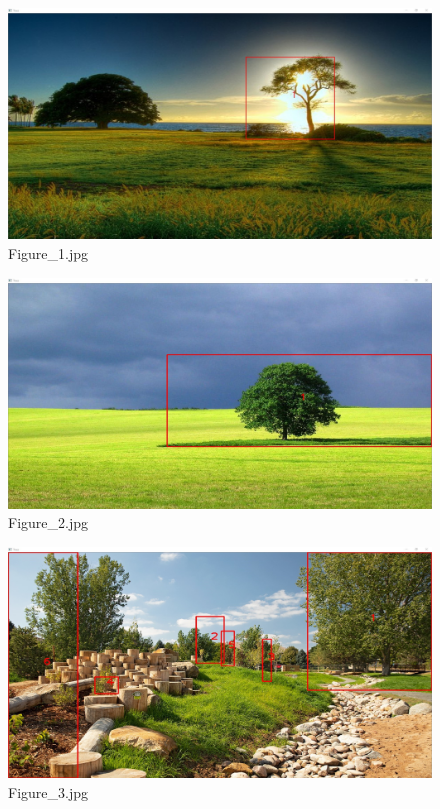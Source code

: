 \documentclass{article}
\begin{document}
\begin{figure}[h]
\begin{center}
\includegraphics[width=1\textwidth]{images/b1}
\caption{\footnotesize{Figure\_1.jpg}}
\label{img:benchmark1}
\end{center}
\end{figure}

\begin{figure}[h]
\begin{center}
\includegraphics[width=1\textwidth]{images/b2}
\caption{\footnotesize{Figure\_2.jpg}}
\label{img:benchmark2}
\end{center}
\end{figure}

\begin{figure}[h]
\begin{center}
\includegraphics[width=1\textwidth]{images/b3}
\caption{\footnotesize{Figure\_3.jpg}}
\label{img:benchmark3}
\end{center}
\end{figure}
\end{document}
